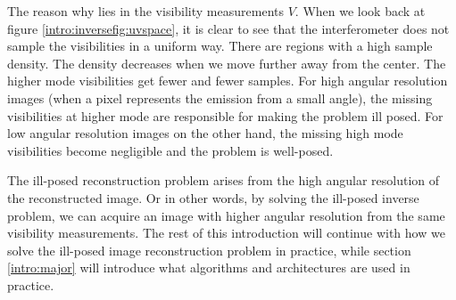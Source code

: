 The reason why lies in the visibility measurements $V$. When we look back at figure \ref{intro:inversefig:uvspace}, it is clear to see that the interferometer does not sample the visibilities in a uniform way. There are regions with a high sample density. The density decreases when we move further away from the center. The higher mode visibilities get fewer and fewer samples. For high angular resolution images (when a pixel represents the emission from a small angle), the missing visibilities at higher mode are responsible for making the problem ill posed. For low angular resolution images on the other hand, the missing high mode visibilities become negligible and the problem is well-posed. 

The ill-posed reconstruction problem arises from the high angular resolution of the reconstructed image. Or in other words, by solving the ill-posed inverse problem, we can acquire an image with higher angular resolution from the same visibility measurements. The rest of this introduction will continue with how we solve the ill-posed image reconstruction problem in practice, while section \ref{intro:major} will introduce what algorithms and architectures are used in practice.




